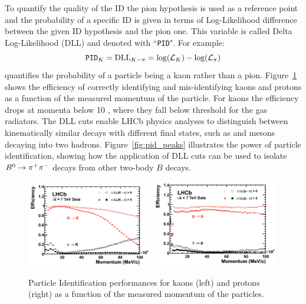 To quantify the quality of the ID the pion hypothesis is used as a reference point and the probability
of a specific ID is given in terms of  Log-Likelihood difference between the given ID hypothesis and the pion one.
This variable is called Delta Log-Likelihood (DLL) and denoted with ``\verb!PID!".
For example:
\begin{equation}
\verb!PID!_K = \text{DLL}_{K-\pi} = \log(\mathcal{L}_K) - \log(\mathcal{L}_\pi)
\end{equation}
quantifies the probability of a particle being a kaon rather than a pion.
Figure~\ref{fig:pid_perf} shows the efficiency of correctly identifying and mis-identifying kaons and protons
as a function of the measured momentum of the particle. For kaons the efficiency drops at momenta below
10 \gev, where they fall below threshold for the gas radiators. 
The DLL cuts enable LHCb physics analyses to distinguish between kinematically similar decays 
with different final states, such as \Bz and \Bs mesons decaying into two hadrons.
Figure~\ref{fig:pid_peaks} illustrates the power of particle identification,  showing how the application
of DLL cuts can be used to isolate $\Bz\to \pi^+\pi^-$ decays from other two-body $B$ decays.
%
\begin{figure}[h!]
\centering
\includegraphics[width=0.49\textwidth]{Detector/figs/kaon_pid_perf.png}
\includegraphics[width=0.49\textwidth]{Detector/figs/proton_pid_perf.png}
\caption{Particle Identification performances for kaons (left) and protons (right) as a function of the measured momentum of the particles. }
\label{fig:pid_perf}
\end{figure}
